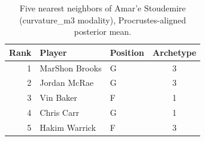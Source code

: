 \begin{table}[htbp]
  \centering\small
  \begin{tabular}{rllc}
    \toprule
    Rank & Player & Position & Archetype \\
    \midrule
    1 & MarShon Brooks & G & 3 \\
    2 & Jordan McRae & G & 3 \\
    3 & Vin Baker & F & 1 \\
    4 & Chris Carr & G & 1 \\
    5 & Hakim Warrick & F & 3 \\
    \bottomrule
  \end{tabular}
  \caption{Five nearest neighbors of Amar'e Stoudemire (curvature_m3 modality), Procrustes-aligned posterior mean.}
  \label{tab:Amar_e_Stoudemire_neighbors_curvature_m3}
\end{table}


